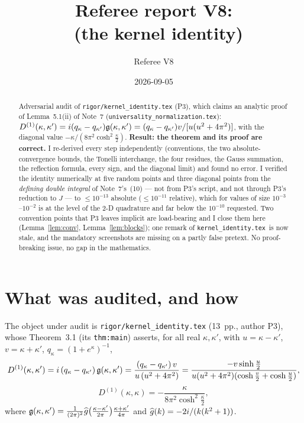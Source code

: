 \documentclass[11pt]{article}
\title{Referee report V8:\\ \KI\ (the kernel identity)}
\author{Referee V8}\date{2026-09-05}
\newcommand{\KI}{\texttt{kernel\_identity.tex}}\newcommand{\NOTE}{\texttt{universality\_normalization.tex}}
\begin{document}
\maketitle

\begin{abstract}\noindent
Adversarial audit of \texttt{rigor/kernel\_identity.tex} (P3), which claims an analytic proof of
Lemma~5.1(ii) of Note~7 (\NOTE): \(D^{(1)}(\kappa,\kappa')=i(q_\kappa-q_{\kappa'})
\mathfrak g(\kappa,\kappa')=(q_\kappa-q_{\kappa'})v/[u(u^2+4\pi^2)]\), with the diagonal value
\(-\kappa/(8\pi^2\cosh^2\frac\kappa2)\).  \textbf{Result: the theorem and its proof are correct.}
I re-derived every step independently (conventions, the two absolute-convergence bounds, the
Tonelli interchange, the four residues, the Gauss summation, the reflection formula, every sign,
and the diagonal limit) and found no error.  I verified the identity numerically at five random
points and three diagonal points from the \emph{defining double integral} of Note~7's~(10) --- not
from P3's script, and not through P3's reduction to \(J\) --- to \(\le10^{-13}\) absolute
(\(\le10^{-11}\) relative), which for values of size \(10^{-3}\)--\(10^{-2}\) is at the level of the
2-D quadrature and far below the \(10^{-10}\) requested.  Two convention points that P3 leaves
implicit are load-bearing and I close them here (Lemma~\ref{lem:conv}, Lemma~\ref{lem:blocks}); one
remark of \KI\ is now stale, and the mandatory screenshots are missing on a partly false pretext.
No proof-breaking issue, no gap in the mathematics.
\end{abstract}

\tableofcontents

\section{What was audited, and how}\label{sec:scope}

The object under audit is \texttt{rigor/kernel\_identity.tex} (13~pp., author P3), whose
Theorem~3.1 (its \texttt{thm:main}) asserts, for all real \(\kappa,\kappa'\), with
\(u=\kappa-\kappa'\), \(v=\kappa+\kappa'\), \(q_\kappa=(1+e^\kappa)^{-1}\),
\begin{equation}\label{eq:target}
 D^{(1)}(\kappa,\kappa')=i\,(q_\kappa-q_{\kappa'})\,\mathfrak g(\kappa,\kappa')
 =\frac{(q_\kappa-q_{\kappa'})\,v}{u\,(u^2+4\pi^2)}
 =\frac{-v\sinh\frac u2}{u(u^2+4\pi^2)(\cosh\frac v2+\cosh\frac u2)},
\end{equation}
\begin{equation}\label{eq:targetdiag}
 D^{(1)}(\kappa,\kappa)=-\frac{\kappa}{8\pi^2\cosh^2\frac\kappa2},
\end{equation}
where \(\mathfrak g(\kappa,\kappa')=\frac1{(2\pi)^2}\widehat g\bigl(\frac{\kappa-\kappa'}{2\pi}\bigr)
\frac{\kappa+\kappa'}{4\pi}\) and \(\widehat g(k)=-2i/(k(k^2+1))\).
\end{document}
